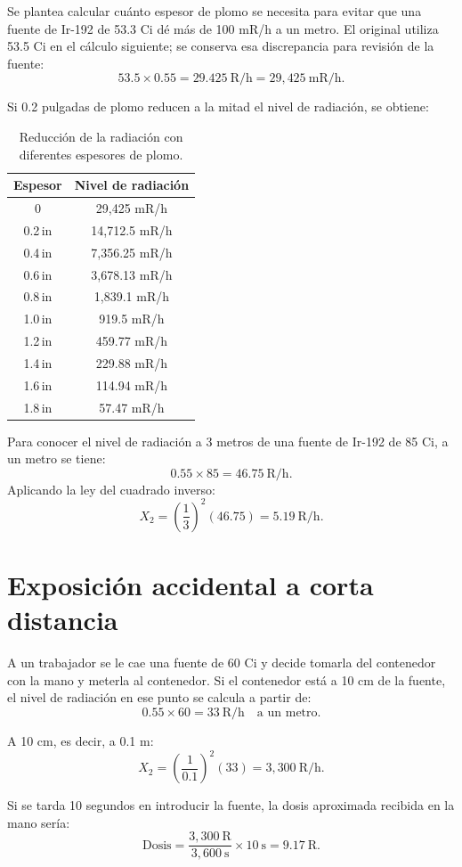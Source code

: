 Se plantea calcular cuánto espesor de plomo se necesita para evitar que una fuente de Ir-192 de 53.3 Ci dé más de 100 mR/h a un metro. El original utiliza 53.5 Ci en el cálculo siguiente; se conserva esa discrepancia para revisión de la fuente:
\[
53.5\times0.55=29.425\ \mathrm{R/h}=29{,}425\ \mathrm{mR/h}.
\]

Si 0.2 pulgadas de plomo reducen a la mitad el nivel de radiación, se obtiene:
\begin{table}[ht]
\centering
\caption{Reducción de la radiación con diferentes espesores de plomo.}
\label{tab:plomo-reduccion}
\begin{tabular}{|c|c|}
\hline
\textbf{Espesor} & \textbf{Nivel de radiación} \\
\hline
0      & 29{,}425 mR/h \\
0.2\,in & 14{,}712.5 mR/h \\
0.4\,in & 7{,}356.25 mR/h \\
0.6\,in & 3{,}678.13 mR/h \\
0.8\,in & 1{,}839.1 mR/h \\
1.0\,in & 919.5 mR/h \\
1.2\,in & 459.77 mR/h \\
1.4\,in & 229.88 mR/h \\
1.6\,in & 114.94 mR/h \\
1.8\,in & 57.47 mR/h \\
\hline
\end{tabular}
\end{table}

Para conocer el nivel de radiación a 3 metros de una fuente de Ir-192 de 85 Ci, a un metro se tiene:
\[
0.55\times85=46.75\ \mathrm{R/h}.
\]
Aplicando la ley del cuadrado inverso:
\[
X_2=\left(\frac{1}{3}\right)^2(46.75)=5.19\ \mathrm{R/h}.
\]

\section{Exposición accidental a corta distancia}

A un trabajador se le cae una fuente de 60 Ci y decide tomarla del contenedor con la mano y meterla al contenedor. Si el contenedor está a 10 cm de la fuente, el nivel de radiación en ese punto se calcula a partir de:
\[
0.55\times60=33\ \mathrm{R/h}\quad\text{a un metro}.
\]

A 10 cm, es decir, a 0.1 m:
\[
X_2=\left(\frac{1}{0.1}\right)^2(33)=3{,}300\ \mathrm{R/h}.
\]

Si se tarda 10 segundos en introducir la fuente, la dosis aproximada recibida en la mano sería:
\[
\text{Dosis}=\frac{3{,}300\ \mathrm{R}}{3{,}600\ \mathrm{s}}\times10\ \mathrm{s}=9.17\ \mathrm{R}.
\]


